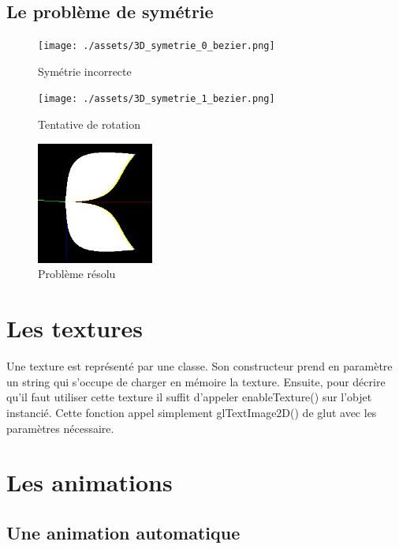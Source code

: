 \documentclass{article}
\begin{document}
\subsection{Le problème de symétrie}

\begin{figure}[!htb]
	\centering
	\begin{minipage}{0.3\textwidth}
    	\centering
    	\texttt{[image: ./assets/3D\_symetrie\_0\_bezier.png]}
    	\caption{Symétrie incorrecte}
	\end{minipage}
	\begin{minipage}{0.3\textwidth}
    	\centering
    	\texttt{[image: ./assets/3D\_symetrie\_1\_bezier.png]}
    	\caption{Tentative de rotation}
	\end{minipage}
	\begin{minipage}{0.3\textwidth}
    	\centering
    	\includegraphics[height=4cm]{./assets/3D_symetrie_2_bezier.png}
    	\caption{Problème résolu}
	\end{minipage}
\end{figure}


\section{Les textures}

Une texture est représenté par une classe. Son constructeur prend en paramètre un string qui s'occupe de charger en mémoire la texture. Ensuite, pour décrire qu'il faut utiliser cette texture il suffit d'appeler enableTexture() sur l'objet instancié. Cette fonction appel simplement glTextImage2D() de glut avec les paramètres nécessaire.  


\section{Les animations}

\subsection{Une animation automatique}
\end{document}
